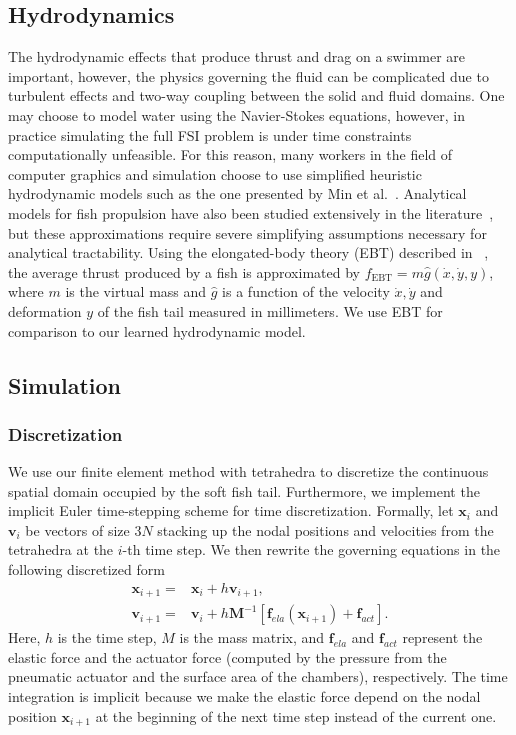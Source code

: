 \subsection{Hydrodynamics}
\label{hydrodynamics}
The hydrodynamic effects that produce thrust and drag on a swimmer are important, however, the physics governing the fluid can be complicated due to turbulent effects and two-way coupling between the solid and fluid domains. One may choose to model water using the Navier-Stokes equations, however, in practice simulating the full FSI problem is under time constraints computationally unfeasible. For this reason, many workers in the field of computer graphics and simulation choose to use simplified heuristic hydrodynamic models such as the one presented by Min et al.~\cite{min2019softcon}. Analytical models for fish propulsion have also been studied extensively in the literature~\cite{lighthill1971large, wu1961swimming, triantafyllou2000hydrodynamics}, but these approximations require severe simplifying assumptions necessary for analytical tractability. Using the elongated-body theory (EBT) described in ~\cite{lighthill1971large}, the average thrust produced by a fish is approximated by
$f_\textrm{EBT} = m \hat{g}(\dot{x},\dot{y},y)$,
where $m$ is the virtual mass and $\hat{g}$ is a function of the velocity $\dot{x},\dot{y}$ and deformation $y$ of the fish tail measured in millimeters. We use EBT for comparison to our learned hydrodynamic model.

\subsection{Simulation}
\label{simulation}

\subsubsection{Discretization} 
We use our finite element method with tetrahedra to discretize the continuous spatial domain occupied by the soft fish tail. Furthermore, we implement the implicit Euler time-stepping scheme for time discretization. Formally, let $\mathbf{x}_i$ and $\mathbf{v}_i$ be vectors of size $3N$ stacking up the nodal positions and velocities from the tetrahedra at the $i$-th time step. We then rewrite the governing equations in the following discretized form
\begin{align}\label{eqn:discretization}
    \mathbf{x}_{i+1}=&\mathbf{x}_{i}+h\mathbf{v}_{i+1},\\
    \mathbf{v}_{i+1}=&\mathbf{v}_i+h\mathbf{M}^{-1}[\mathbf{f}_{ela}(\mathbf{x}_{i+1})+\mathbf{f}_{act}].
\end{align}
Here, $h$ is the time step, $M$ is the mass matrix, and $\mathbf{f}_{ela}$ and $\mathbf{f}_{act}$ represent the elastic force and the actuator force (computed by the pressure from the pneumatic actuator and the surface area of the chambers), respectively. The time integration is implicit because we make the elastic force depend on the nodal position $\mathbf{x}_{i+1}$ at the beginning of the next time step instead of the current one.


